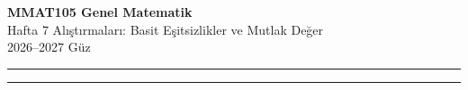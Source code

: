 \documentclass[11pt,a4paper]{article}
\newcounter{alis}
\begin{document}
\begin{minipage}[c]{\textwidth}
{\LARGE\bfseries\color{anamavi} MMAT105 Genel Matematik}\\[4pt]
{\large Hafta 7 Alıştırmaları: Basit Eşitsizlikler ve Mutlak Değer}\\[6pt]
{\small 2026--2027 Güz}
\end{minipage}

\vspace{4pt}\noindent\textcolor{anamavi}{\rule{\textwidth}{1pt}}



\vspace{6pt}
\noindent\textcolor{anamavi}{\rule{\textwidth}{0.5pt}}\\
{\small }
\end{document}
